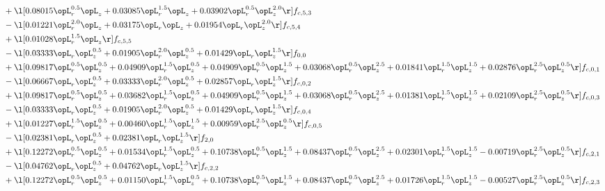 \begin{alignat}{2}
& + \l[  0.08015 \opL_r^{0.5} \opL_z +  0.03085 \opL_r^{1.5} \opL_z +  0.03902 \opL_r^{0.5} \opL_z^{2.0}  \r] f_{c,5,3} \nonumber \\ 
& - \l[  0.01221 \opL_r^{2.0} \opL_z +  0.03175 \opL_r \opL_z +  0.01954 \opL_r \opL_z^{2.0}  \r] f_{c,5,4} \nonumber \\ 
& + \l[  0.01028 \opL_r^{1.5} \opL_z  \r] f_{c,5,5} \nonumber \\ 
& - \l[  0.03333 \opL_r \opL_z^{0.5} +  0.01905 \opL_r^{2.0} \opL_z^{0.5} +  0.01429 \opL_r \opL_z^{1.5}  \r] f_{0,0} \nonumber \\ 
& + \l[  0.09817 \opL_r^{0.5} \opL_z^{0.5} +  0.04909 \opL_r^{1.5} \opL_z^{0.5} +  0.04909 \opL_r^{0.5} \opL_z^{1.5} +  0.03068 \opL_r^{0.5} \opL_z^{2.5} +  0.01841 \opL_r^{1.5} \opL_z^{1.5} +  0.02876 \opL_r^{2.5} \opL_z^{0.5}  \r] f_{c,0,1} \nonumber \\ 
& - \l[  0.06667 \opL_r \opL_z^{0.5} +  0.03333 \opL_r^{2.0} \opL_z^{0.5} +  0.02857 \opL_r \opL_z^{1.5}  \r] f_{c,0,2} \nonumber \\ 
& + \l[  0.09817 \opL_r^{0.5} \opL_z^{0.5} +  0.03682 \opL_r^{1.5} \opL_z^{0.5} +  0.04909 \opL_r^{0.5} \opL_z^{1.5} +  0.03068 \opL_r^{0.5} \opL_z^{2.5} +  0.01381 \opL_r^{1.5} \opL_z^{1.5} +  0.02109 \opL_r^{2.5} \opL_z^{0.5}  \r] f_{c,0,3} \nonumber \\ 
& - \l[  0.03333 \opL_r \opL_z^{0.5} +  0.01905 \opL_r^{2.0} \opL_z^{0.5} +  0.01429 \opL_r \opL_z^{1.5}  \r] f_{c,0,4} \nonumber \\ 
& + \l[  0.01227 \opL_r^{1.5} \opL_z^{0.5} +  0.00460 \opL_r^{1.5} \opL_z^{1.5} +  0.00959 \opL_r^{2.5} \opL_z^{0.5}  \r] f_{c,0,5} \nonumber \\ 
& - \l[  0.02381 \opL_r \opL_z^{0.5} +  0.02381 \opL_r \opL_z^{1.5}  \r] f_{2,0} \nonumber \\ 
& + \l[  0.12272 \opL_r^{0.5} \opL_z^{0.5} +  0.01534 \opL_r^{1.5} \opL_z^{0.5} +  0.10738 \opL_r^{0.5} \opL_z^{1.5} +  0.08437 \opL_r^{0.5} \opL_z^{2.5} +  0.02301 \opL_r^{1.5} \opL_z^{1.5}   -0.00719 \opL_r^{2.5} \opL_z^{0.5}  \r] f_{c,2,1} \nonumber \\ 
& - \l[  0.04762 \opL_r \opL_z^{0.5} +  0.04762 \opL_r \opL_z^{1.5}  \r] f_{c,2,2} \nonumber \\ 
& + \l[  0.12272 \opL_r^{0.5} \opL_z^{0.5} +  0.01150 \opL_r^{1.5} \opL_z^{0.5} +  0.10738 \opL_r^{0.5} \opL_z^{1.5} +  0.08437 \opL_r^{0.5} \opL_z^{2.5} +  0.01726 \opL_r^{1.5} \opL_z^{1.5}   -0.00527 \opL_r^{2.5} \opL_z^{0.5}  \r] f_{c,2,3} \nonumber \\ 

\end{alignat}
